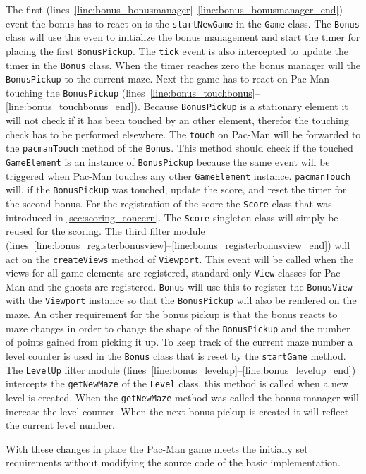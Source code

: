 The first (lines~\ref{line:bonus_bonusmanager}--\ref{line:bonus_bonusmanager_end}) event the bonus has to react on is the \lstinline|startNewGame| in the \lstinline|Game| class. 
The \lstinline|Bonus| class will use this even to initialize the bonus management and start the timer for placing the first \lstinline|BonusPickup|. 
The \lstinline|tick| event is also intercepted to update the timer in the \lstinline|Bonus| class. 
When the timer reaches zero the bonus manager will the \lstinline|BonusPickup| to the current maze.
Next the game has to react on Pac-Man touching the \lstinline|BonusPickup| (lines~\ref{line:bonus_touchbonus}--\ref{line:bonus_touchbonus_end}). 
Because \lstinline|BonusPickup| is a stationary element it will not check if it has been touched by an other element, therefor the touching check has to be performed elsewhere.
The \lstinline|touch| on Pac-Man will be forwarded to the \lstinline|pacmanTouch| method of the \lstinline|Bonus|. 
This method should check if the touched \lstinline|GameElement| is an instance of \lstinline|BonusPickup| because the same event will be triggered when Pac-Man touches any other \lstinline|GameElement| instance. 
\lstinline|pacmanTouch| will, if the \lstinline|BonusPickup| was touched, update the score, and reset the timer for the second bonus. 
For the registration of the score the \lstinline|Score| class that was introduced in \ref{sec:scoring_concern}.
The \lstinline|Score| singleton class will simply be reused for the scoring.
The third filter module (lines~\ref{line:bonus_registerbonusview}--\ref{line:bonus_registerbonusview_end}) will act on the \lstinline|createViews| method of \lstinline|Viewport|. 
This event will be called when the views for all game elements are registered, standard only \lstinline|View| classes for Pac-Man and the ghosts are registered.
\lstinline|Bonus| will use this to register the \lstinline|BonusView| with the \lstinline|Viewport| instance so that the \lstinline|BonusPickup| will also be rendered on the maze.
An other requirement for the bonus pickup is that the bonus reacts to maze changes in order to change the shape of the \lstinline|BonusPickup| and the number of points gained from picking it up. 
To keep track of the current maze number a level counter is used in the \lstinline|Bonus| class that is reset by the \lstinline|startGame| method. The \lstinline|LevelUp| filter module (lines~\ref{line:bonus_levelup}--\ref{line:bonus_levelup_end}) intercepts the \lstinline|getNewMaze| of the \lstinline|Level| class, this method is called when a new level is created. 
When the \lstinline|getNewMaze| method was called the bonus manager will increase the level counter. When the next bonus pickup is created it will reflect the current level number.

With these changes in place the Pac-Man game meets the initially set requirements without modifying the source code of the basic implementation.
